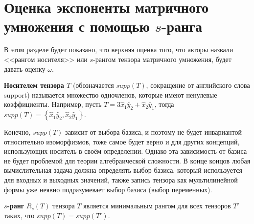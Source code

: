 \section{Оценка экспоненты матричного умножения с помощью $s$-ранга}

В этом разделе будет показано, что верхняя оценка того, что авторы назвали <<рангом носителя>> или $s$-рангом тензора матричного умножения, будет давать оценку $\omega$.
\begin{definition}
 \textbf{Носителем тензора $T$} (обозначается $supp(T)$, сокращение от английского слова support) называется множество одночленов, которые имеют ненулевые коэффициенты. Например, пусть $T=3 \widehat{x}_1 \widehat{y}_2+\widehat{x}_2 \widehat{y}_1$, тогда $supp(T)=\left\{  \widehat{x}_1 \widehat{y}_2, \widehat{x}_2 \widehat{y}_1\right\}$.  
\end{definition}
Конечно, $supp(T)$ зависит от выбора базиса, и поэтому не будет инвариантой относительно изоморфизмов, тоже самое будет верно и для других концепций, использующих носитель в своём определении. Однако эта зависимость от базиса не будет проблемой для теории алгебраической сложности. В конце концов любая вычислительная задача должна определять выбор базиса, который используется для входных и выходных значений, также запись тензора как мультилинейной формы уже неявно подразумевает выбор базиса (выбор переменных).
\begin{definition}
 \textbf{$s$-ранг} $R_s(T)$ тензора $T$ является минимальным рангом для всех тензоров $T'$ таких, что $supp(T)=supp(T')$.  
\end{definition}

